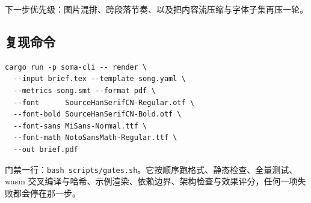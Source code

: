 \documentclass{article}
\begin{document}
下一步优先级：图片混排、跨段落节奏、以及把内容流压缩与字体子集再压一轮。

\subsection{复现命令}

\begin{verbatim}
cargo run -p soma-cli -- render \
  --input brief.tex --template song.yaml \
  --metrics song.smt --format pdf \
  --font      SourceHanSerifCN-Regular.otf \
  --font-bold SourceHanSerifCN-Bold.otf \
  --font-sans MiSans-Normal.ttf \
  --font-math NotoSansMath-Regular.ttf \
  --out brief.pdf
\end{verbatim}

门禁一行：\texttt{bash scripts/gates.sh}。它按顺序跑格式、静态检查、全量测试、wasm 交叉编译与哈希、示例渲染、依赖边界、架构检查与效果评分，任何一项失败都会停在那一步。
\end{document}
